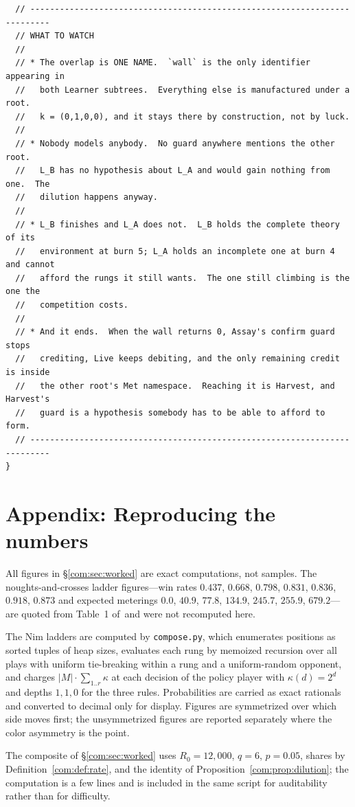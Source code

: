 \begin{lstlisting}
  // --------------------------------------------------------------------------
  // WHAT TO WATCH
  //
  // * The overlap is ONE NAME.  `wall` is the only identifier appearing in
  //   both Learner subtrees.  Everything else is manufactured under a root.
  //   k = (0,1,0,0), and it stays there by construction, not by luck.
  //
  // * Nobody models anybody.  No guard anywhere mentions the other root.
  //   L_B has no hypothesis about L_A and would gain nothing from one.  The
  //   dilution happens anyway.
  //
  // * L_B finishes and L_A does not.  L_B holds the complete theory of its
  //   environment at burn 5; L_A holds an incomplete one at burn 4 and cannot
  //   afford the rungs it still wants.  The one still climbing is the one the
  //   competition costs.
  //
  // * And it ends.  When the wall returns 0, Assay's confirm guard stops
  //   crediting, Live keeps debiting, and the only remaining credit is inside
  //   the other root's Met namespace.  Reaching it is Harvest, and Harvest's
  //   guard is a hypothesis somebody has to be able to afford to form.
  // --------------------------------------------------------------------------
}
\end{lstlisting}

\section{Appendix: Reproducing the numbers}\label{com:app:repro}\label{com:S17}

All figures in \S\ref{com:sec:worked} are exact computations, not samples. The noughts-and-crosses
ladder figures---win rates $0.437$, $0.668$, $0.798$, $0.831$, $0.836$, $0.918$, $0.873$ and
expected meterings $0.0$, $40.9$, $77.8$, $134.9$, $245.7$, $255.9$, $679.2$---are quoted from
Table~1
of~\chGame and were not recomputed here.

The Nim ladders are computed by \texttt{compose.py}, which enumerates positions as sorted tuples
of heap sizes, evaluates each rung by memoized recursion over all plays with uniform tie-breaking
within a rung and a uniform-random opponent, and charges $|M| \cdot \sum_{1..r} \kappa$ at each
decision of the policy player with $\kappa(d) = 2^d$ and depths $1, 1, 0$ for the three rules.
Probabilities are carried as exact rationals and converted to decimal only for display. Figures
are symmetrized over which side moves first; the unsymmetrized figures are reported separately
where the color asymmetry is the point.

The composite of \S\ref{com:sec:worked} uses $R_0 = 12{,}000$, $q = 6$, $p = 0.05$, shares by
Definition~\ref{com:def:rate}, and the identity of Proposition~\ref{com:prop:dilution}; the
computation is a few lines and is included in the same script for auditability rather than for
difficulty.

